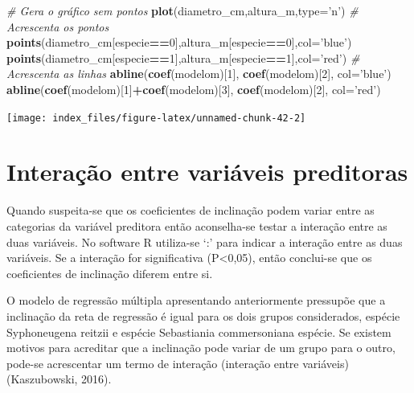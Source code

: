 \documentclass[12pt,brazil,oneside]{book}
\newenvironment{Shaded}{\begin{snugshade}}{\end{snugshade}}
\newcommand{\CommentTok}[1]{\textcolor[rgb]{0.56,0.35,0.01}{\textit{#1}}}
\newcommand{\DataTypeTok}[1]{\textcolor[rgb]{0.13,0.29,0.53}{#1}}
\newcommand{\DecValTok}[1]{\textcolor[rgb]{0.00,0.00,0.81}{#1}}
\newcommand{\KeywordTok}[1]{\textcolor[rgb]{0.13,0.29,0.53}{\textbf{#1}}}
\newcommand{\NormalTok}[1]{#1}
\newcommand{\OperatorTok}[1]{\textcolor[rgb]{0.81,0.36,0.00}{\textbf{#1}}}
\newcommand{\StringTok}[1]{\textcolor[rgb]{0.31,0.60,0.02}{#1}}
\begin{document}
\begin{Shaded}
\begin{Highlighting}[]
\CommentTok{# Gera o gráfico sem pontos}
\KeywordTok{plot}\NormalTok{(diametro_cm,altura_m,}\DataTypeTok{type=}\StringTok{'n'}\NormalTok{) }
\CommentTok{# Acrescenta os pontos}
\KeywordTok{points}\NormalTok{(diametro_cm[especie}\OperatorTok{==}\DecValTok{0}\NormalTok{],altura_m[especie}\OperatorTok{==}\DecValTok{0}\NormalTok{],}\DataTypeTok{col=}\StringTok{'blue'}\NormalTok{)}
\KeywordTok{points}\NormalTok{(diametro_cm[especie}\OperatorTok{==}\DecValTok{1}\NormalTok{],altura_m[especie}\OperatorTok{==}\DecValTok{1}\NormalTok{],}\DataTypeTok{col=}\StringTok{'red'}\NormalTok{)}
\CommentTok{# Acrescenta as linhas}
\KeywordTok{abline}\NormalTok{(}\KeywordTok{coef}\NormalTok{(modelom)[}\DecValTok{1}\NormalTok{], }\KeywordTok{coef}\NormalTok{(modelom)[}\DecValTok{2}\NormalTok{], }\DataTypeTok{col=}\StringTok{'blue'}\NormalTok{)}
\KeywordTok{abline}\NormalTok{(}\KeywordTok{coef}\NormalTok{(modelom)[}\DecValTok{1}\NormalTok{]}\OperatorTok{+}\KeywordTok{coef}\NormalTok{(modelom)[}\DecValTok{3}\NormalTok{], }\KeywordTok{coef}\NormalTok{(modelom)[}\DecValTok{2}\NormalTok{], }\DataTypeTok{col=}\StringTok{'red'}\NormalTok{)}
\end{Highlighting}
\end{Shaded}

\begin{center}\texttt{[image: index\_files/figure-latex/unnamed-chunk-42-2]} \end{center}

\hypertarget{interacao-entre-variaveis-preditoras}{%
\section{Interação entre variáveis preditoras}\label{interacao-entre-variaveis-preditoras}}

Quando suspeita-se que os coeficientes de inclinação podem variar entre as categorias da variável preditora então aconselha-se testar a interação entre as duas variáveis. No software R utiliza-se `:' para indicar a interação entre as duas variáveis. Se a interação for significativa (P\textless{}0,05), então conclui-se que os coeficientes de inclinação diferem entre si.

O modelo de regressão múltipla apresentando anteriormente pressupõe que a inclinação da reta de regressão é igual para os dois grupos considerados, espécie Syphoneugena reitzii e espécie Sebastiania commersoniana espécie. Se existem motivos para acreditar que a inclinação pode variar de um grupo para o outro, pode-se acrescentar um termo de interação (interação entre variáveis) (Kaszubowski, 2016).
\end{document}
